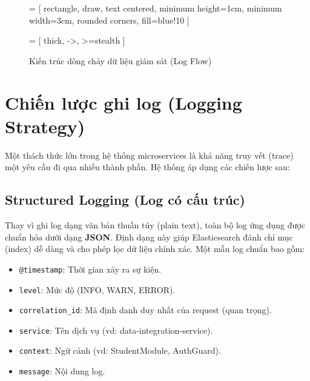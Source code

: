 \begin{figure}[h]
\centering
{} = [
    rectangle,
    draw,
    text centered,
    minimum height=1cm,
    minimum width=3cm,
    rounded corners,
    fill=blue!10
]

 = [
    thick,
    ->,
    >=stealth
]



\caption{Kiến trúc dòng chảy dữ liệu giám sát (Log Flow)}
\end{figure}

\section{Chiến lược ghi log (Logging Strategy)}

Một thách thức lớn trong hệ thống microservices là khả năng truy vết (trace) một yêu cầu đi qua nhiều thành phần. Hệ thống áp dụng các chiến lược sau:

\subsection{Structured Logging (Log có cấu trúc)}
Thay vì ghi log dạng văn bản thuần túy (plain text), toàn bộ log ứng dụng được chuẩn hóa dưới dạng \textbf{JSON}. Định dạng này giúp Elasticsearch đánh chỉ mục (index) dễ dàng và cho phép lọc dữ liệu chính xác.
Một mẫu log chuẩn bao gồm:
\begin{itemize}
    \item \texttt{@timestamp}: Thời gian xảy ra sự kiện.
    \item \texttt{level}: Mức độ (INFO, WARN, ERROR).
    \item \texttt{correlation\_id}: Mã định danh duy nhất của request (quan trọng).
    \item \texttt{service}: Tên dịch vụ (vd: data-integration-service).
    \item \texttt{context}: Ngữ cảnh (vd: StudentModule, AuthGuard).
    \item \texttt{message}: Nội dung log.
\end{itemize}

